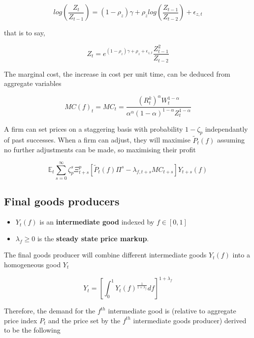 \documentclass[notitlepage,12pt]{report}
\begin{document}
\begin{appendices}
	\begin{equation}
	log\left(\frac{Z_t}{Z_{t-1}}\right)=(1-\rho_z)\gamma+\rho_zlog\left(\frac{Z_{t-1}}{Z_{t-2}}\right)+\epsilon_{z,t}
	\end{equation}
	
	that is to say,
	
	\begin{equation*}
	Z_t=e^{(1-\rho_z)\gamma+\rho_z+\epsilon_{z,t}}\frac{Z_{t-1}^2}{Z_{t-2}}
	\end{equation*}
	
	The marginal cost, the increase in cost per unit time, can be deduced from aggregate variables
	
	\begin{equation}
	MC(f)_t=MC_t=\frac{(R_t^k)^\alpha W_t^{1-\alpha}}{\alpha^\alpha (1-\alpha)^{1-\alpha}Z_t^{1-\alpha}}
	\end{equation}
	
	A firm can set prices on a staggering basis with probability \(1-\zeta_p\) independantly of past successes. When a firm can adjust, they will maximise \(\tilde{P}_t(f)\) assuming no further adjustments can be made, so maximising their profit
	
	\begin{equation}
	\mathbb{E}_t\sum_{s=0}^\infty	\zeta_p^s\Xi_{t+s}^p\left[\tilde{P}_t(f)\Pi^s-\lambda_{f,t+s}MC_{t+s}\right]Y_{t+s}(f)
	\end{equation}
	
	\subsection{Final goods producers}
	
	\begin{itemize}
		\item \(Y_t(f)\) is an {\bf intermediate good} indexed by \(f\in[0,1]\)
		\item \(\lambda_f\geq0\) is the {\bf steady state price markup}.
	\end{itemize}
	
	The final goods producer will combine different intermediate goods \(Y_t(f)\) into a homogeneous good \(Y_t\)
	
	\begin{equation}
	Y_t = \left[ \int_0^1 Y_t(f)^{\frac{1}{1+\lambda_f}}df\right]^{1+\lambda_f}
	\end{equation}
	
	Therefore, the demand for the \(f^{th}\) intermediate good is (relative to aggregate price index \(P_t\) and the price set by the \(f^{th}\) intermediate goods producer) derived to be the following\cite{chen_technical_2011}
	

\end{appendices}
\end{document}
